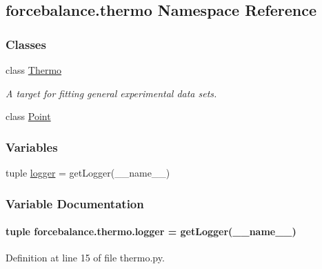 \hypertarget{namespaceforcebalance_1_1thermo}{\subsection{forcebalance.\-thermo Namespace Reference}
\label{namespaceforcebalance_1_1thermo}
}
\subsubsection*{Classes}
\begin{DoxyCompactItemize}
\item 
class \hyperlink{classforcebalance_1_1thermo_1_1Thermo}{Thermo}
\begin{DoxyCompactList}\small\item\em A target for fitting general experimental data sets. \end{DoxyCompactList}\item 
class \hyperlink{classforcebalance_1_1thermo_1_1Point}{Point}
\end{DoxyCompactItemize}
\subsubsection*{Variables}
\begin{DoxyCompactItemize}
\item 
tuple \hyperlink{namespaceforcebalance_1_1thermo_ae82b6b46a271d5e703659d175cf81632}{logger} = get\-Logger(\-\_\-\-\_\-name\-\_\-\-\_\-)
\end{DoxyCompactItemize}


\subsubsection{Variable Documentation}
\hypertarget{namespaceforcebalance_1_1thermo_ae82b6b46a271d5e703659d175cf81632}{
\paragraph[{logger}]{\setlength{\rightskip}{0pt plus 5cm}tuple forcebalance.\-thermo.\-logger = get\-Logger(\-\_\-\-\_\-name\-\_\-\-\_\-)}}\label{namespaceforcebalance_1_1thermo_ae82b6b46a271d5e703659d175cf81632}


Definition at line 15 of file thermo.\-py.

